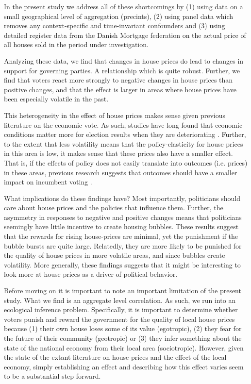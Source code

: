 \documentclass[12pt,a4paper]{article}
\begin{document}
In the present study we address all of these shortcomings by (1) using data on a small geographical level of aggregation (precints), (2) using panel data which removes any context-specific and time-invariant confounders and (3) using detailed register data from the Danish Mortgage federation on the actual price of all houses sold in the period under investigation. 

Analyzing these data, we find that changes in house prices do lead to changes in support for governing parties. A relationship which is quite robust. Further, we find that voters react more strongly to negative changes in house prices than positive changes, and that the effect is larger in areas where house prices have been especially volatile in the past. 

This heterogeneity in the effect of house prices makes sense given previous literature on the economic vote. As such, studies have long found that economic conditions matter more for election results when they are deteriorating \citep[e.g.]{bloom1975voter,headrick1991attention,nannestad1997grievance}. Further, to the extent that less volatility means that the policy-elasticity for house prices in this area is low, it makes sense that these prices also have a smaller effect. That is, if the effects of policy does not easily translate into outcomes (i.e. prices) in these areas, previous research suggests that outcomes should have a smaller impact on incumbent voting \citep{duch2008economic}.

What implications do these findings have? Most importantly, politicians should care about house prices and the policies that influence them.  Further, the asymmetry in responses to negative and positive changes means that politicians seemingly have little incentive to create housing bubbles. These results suggest that the rewards for rising house-prices are minimal, yet the punishment if the bubble bursts are quite large. Relatedly, they are more likely to be punished for the quality of house prices in more volatile areas, and since bubbles create volatility. More generally, these findings suggests that it might be interesting to look more at house prices as a driver of political behavior.

Before moving on it is important to note an important limitation of the present study. What we find is an aggregate level correlation. As such, we run into an ecological inference problem. Specifically, it is important to determine whether voters punish and reward the government for the quality of local house prices  because (1) their own house loses some of its value (egotropic), (2) they fear for the future of their community (geotropic) or (3) they infer something about the state of the national economy from their local area (sociotropic). However, given the state of the extant literature on house prices and the effect of the local economy, simply establishing an effect and describing how this effect varies seem to be a substantial step forward. 
\end{document}
